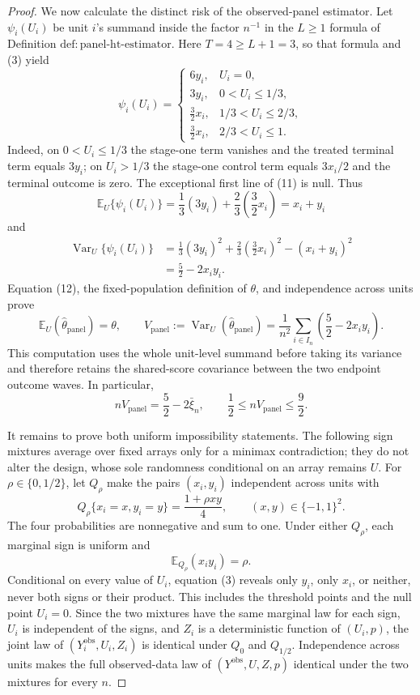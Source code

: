\documentclass{article}
\begin{document}
\begin{proof}
We now calculate the distinct risk of the observed-panel estimator.  Let \(\psi_i(U_i)\) be unit \(i\)'s summand inside the factor \(n^{-1}\) in the \(L\ge1\) formula of Definition \(\mathrm{def:panel\text{-}ht\text{-}estimator}\).  Here \(T=4\ge L+1=3\), so that formula and (3) yield
\[
\psi_i(U_i)=
\begin{cases}
6y_i,&U_i=0,\\
3y_i,&0<U_i\le1/3,\\
\frac32x_i,&1/3<U_i\le2/3,\\
\frac32x_i,&2/3<U_i\le1.
\end{cases}
\tag{11}
\]
Indeed, on \(0<U_i\le1/3\) the stage-one term vanishes and the treated terminal term equals \(3y_i\); on \(U_i>1/3\) the stage-one control term equals \(3x_i/2\) and the terminal outcome is zero.  The exceptional first line of (11) is null.  Thus
\[
\mathbb E_U\{\psi_i(U_i)\}
=\frac13(3y_i)+\frac23\left(\frac32x_i\right)
=x_i+y_i
\tag{12}
\]
and
\[
\begin{aligned}
\operatorname{Var}_U\{\psi_i(U_i)\}
&=\frac13(3y_i)^2+\frac23\left(\frac32x_i\right)^2-(x_i+y_i)^2\\
&=\frac52-2x_i y_i.
\end{aligned}
\tag{13}
\]
Equation (12), the fixed-population definition of \(\theta\), and independence across units prove
\[
\mathbb E_U(\widehat\theta_{\mathrm{panel}})=\theta,
\qquad
V_{\mathrm{panel}}
:=\operatorname{Var}_U(\widehat\theta_{\mathrm{panel}})
=\frac1{n^2}\sum_{i\in I_n}\left(\frac52-2x_i y_i\right).
\tag{14}
\]
This computation uses the whole unit-level summand before taking its variance and therefore retains the shared-score covariance between the two endpoint outcome waves.  In particular,
\[
nV_{\mathrm{panel}}=\frac52-2\bar\xi_n,
\qquad
\frac12\le nV_{\mathrm{panel}}\le\frac92.
\tag{15}
\]

It remains to prove both uniform impossibility statements.  The following sign mixtures average over fixed arrays only for a minimax contradiction; they do not alter the design, whose sole randomness conditional on an array remains \(U\).  For \(\rho\in\{0,1/2\}\), let \(Q_\rho\) make the pairs \((x_i,y_i)\) independent across units with
\[
Q_\rho\{x_i=x,y_i=y\}=\frac{1+\rho xy}{4},
\qquad (x,y)\in\{-1,1\}^2.
\tag{16}
\]
The four probabilities are nonnegative and sum to one.  Under either \(Q_\rho\), each marginal sign is uniform and
\[
\mathbb E_{Q_\rho}(x_i y_i)=\rho.
\tag{17}
\]
Conditional on every value of \(U_i\), equation (3) reveals only \(y_i\), only \(x_i\), or neither, never both signs or their product.  This includes the threshold points and the null point \(U_i=0\).  Since the two mixtures have the same marginal law for each sign, \(U_i\) is independent of the signs, and \(Z_i\) is a deterministic function of \((U_i,p)\), the joint law of \((Y_i^{\mathrm{obs}},U_i,Z_i)\) is identical under \(Q_0\) and \(Q_{1/2}\).  Independence across units makes the full observed-data law of \((Y^{\mathrm{obs}},U,Z,p)\) identical under the two mixtures for every \(n\).


\end{proof}
\end{document}

